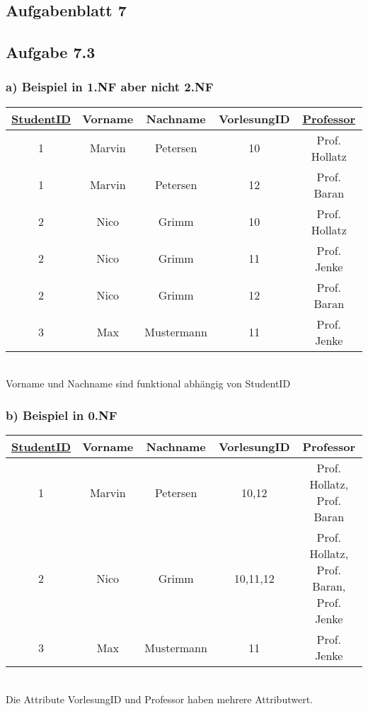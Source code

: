 \documentclass{article}
\begin{document}

\begin{center}
\section*{Aufgabenblatt 7}
\end{center}

\subsection*{Aufgabe 7.3}

\subsubsection*{a) Beispiel in 1.NF aber nicht 2.NF}

\begin{tabular}{|c|c|c|c|c|} \hline
\underline{StudentID} & Vorname & Nachname & VorlesungID & \underline{Professor} \\ \hline \hline
1 & Marvin & Petersen & 10 & Prof. Hollatz \\ \hline
1 & Marvin & Petersen & 12 & Prof. Baran \\ \hline
2 & Nico & Grimm & 10 & Prof. Hollatz \\ \hline
2 & Nico & Grimm & 11 & Prof. Jenke \\ \hline
2 & Nico & Grimm & 12 & Prof. Baran \\ \hline
3 & Max & Mustermann & 11 & Prof. Jenke \\ \hline
\end{tabular} \\[2ex]
Vorname und Nachname sind funktional abh\"angig von StudentID

\subsubsection*{b) Beispiel in 0.NF}

\begin{tabular}{|c|c|c|c|c|} \hline
\underline{StudentID} & Vorname & Nachname & VorlesungID & Professor \\ \hline \hline
1 & Marvin & Petersen & 10,12 & Prof. Hollatz, Prof. Baran \\ \hline
2 & Nico & Grimm & 10,11,12 & Prof. Hollatz, Prof. Baran, Prof. Jenke \\ \hline
3 & Max & Mustermann & 11 & Prof. Jenke \\ \hline
\end{tabular} \\[2ex]
Die Attribute VorlesungID und Professor haben mehrere Attributwert.
\end{document}
